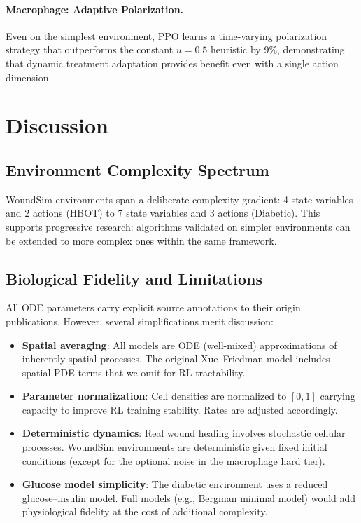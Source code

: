 \documentclass[11pt,a4paper]{article}
\begin{document}
\paragraph{Macrophage: Adaptive Polarization.}
Even on the simplest environment, PPO learns a time-varying polarization strategy that outperforms the constant $u = 0.5$ heuristic by 9\%, demonstrating that dynamic treatment adaptation provides benefit even with a single action dimension.

\section{Discussion}

\subsection{Environment Complexity Spectrum}

WoundSim environments span a deliberate complexity gradient: 4 state variables and 2 actions (HBOT) to 7 state variables and 3 actions (Diabetic). This supports progressive research: algorithms validated on simpler environments can be extended to more complex ones within the same framework.

\subsection{Biological Fidelity and Limitations}

All ODE parameters carry explicit source annotations to their origin publications. However, several simplifications merit discussion:

\begin{itemize}
    \item \textbf{Spatial averaging}: All models are ODE (well-mixed) approximations of inherently spatial processes. The original Xue--Friedman model \citep{xue2009} includes spatial PDE terms that we omit for RL tractability.
    \item \textbf{Parameter normalization}: Cell densities are normalized to $[0, 1]$ carrying capacity to improve RL training stability. Rates are adjusted accordingly.
    \item \textbf{Deterministic dynamics}: Real wound healing involves stochastic cellular processes. WoundSim environments are deterministic given fixed initial conditions (except for the optional noise in the macrophage hard tier).
    \item \textbf{Glucose model simplicity}: The diabetic environment uses a reduced glucose--insulin model. Full models (e.g., Bergman minimal model) would add physiological fidelity at the cost of additional complexity.
\end{itemize}
\end{document}

